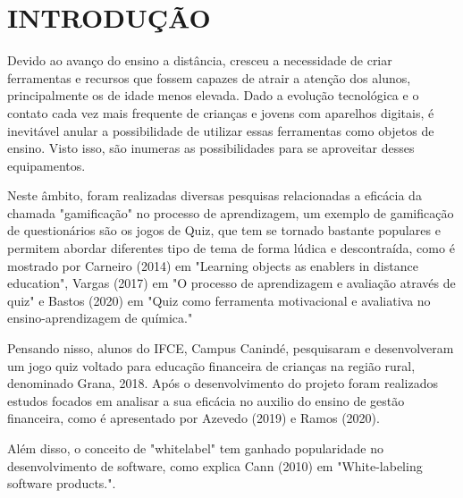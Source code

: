 \chapter{INTRODUÇÃO}
\thispagestyle{empty}

Devido ao avanço do ensino a distância, cresceu a necessidade de criar ferramentas e recursos que fossem capazes de atrair a atenção dos alunos, principalmente os de idade menos elevada. Dado a evolução tecnológica e o contato cada vez mais frequente de crianças e jovens com aparelhos digitais, é inevitável anular a possibilidade de utilizar essas ferramentas como objetos de ensino. Visto isso, são inumeras as possibilidades para se aproveitar desses equipamentos.

Neste âmbito, foram realizadas diversas pesquisas relacionadas a eficácia da chamada "gamificação" no processo de aprendizagem, um exemplo de gamificação de questionários são os jogos de Quiz, que tem se tornado bastante populares e permitem abordar diferentes tipo de tema de forma lúdica e descontraída, como é mostrado por Carneiro (2014) em "Learning objects as enablers in distance education"\nocite{carneiro2014learning}, Vargas (2017) em "O processo de aprendizagem e avaliação através de
quiz"\nocite{vargas2017processo} e Bastos (2020) em "Quiz como ferramenta motivacional e avaliativa no ensino-aprendizagem de química."\nocite{bastos2020quiz}

Pensando nisso, alunos do IFCE, Campus Canindé, pesquisaram e desenvolveram um jogo quiz voltado para educação financeira de crianças na região rural, denominado Grana, 2018\nocite{pereira2018grana}. Após o desenvolvimento do projeto foram realizados estudos focados em analisar a sua eficácia no auxilio do ensino de gestão financeira, como é apresentado por Azevedo (2019)\nocite{azevedo2019analise} e Ramos (2020)\nocite{ramos2020analise}.

Além disso, o conceito de "whitelabel" tem ganhado popularidade no desenvolvimento de software, como explica Cann (2010) em "White-labeling software products.".